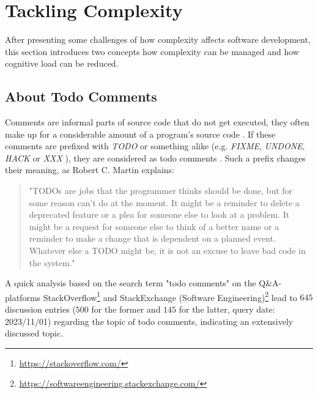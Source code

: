 \section{Tackling Complexity}
\label{sec:tackling-complexity}
After presenting some challenges of how complexity affects software development, this section introduces two concepts how complexity can be managed and how cognitive load can be reduced.

\subsection{About Todo Comments}
\label{sec:introduction-about-todo-comments}
Comments are informal parts of source code that do not get executed, they often make up for a considerable amount of a program's source code \cite{nie_natural_2018}.
If these comments are prefixed with \emph{TODO} or something alike (e.g. \emph{FIXME}, \emph{UNDONE}, \emph{HACK} or \emph{XXX} \cite{storey_how_2009}), they are considered as todo comments \cite{ying_source_2005}.
Such a prefix changes their meaning, as Robert C. Martin explains:
%
\begin{quote}
    "TODOs are jobs that the programmer thinks should be done, but for some reason can't do at the moment. It might be a reminder to delete a deprecated feature or a plea for someone else to look at a problem. It might be a request for someone else to think of a better name or a reminder to make a change that is dependent on a planned event. Whatever else a TODO might be, it is not an excuse to leave bad code in the system." \cite{martin_clean_2009}
\end{quote}
%
A quick analysis based on the search term "todo comments" on the Q\&A-platforms StackOverflow\footnote{\url{https://stackoverflow.com/}} and StackExchange (Software Engineering)\footnote{\url{https://softwareengineering.stackexchange.com/}} lead to $645$ discussion entries ($500$ for the former and $145$ for the latter, query date: 2023/11/01) regarding the topic of todo comments, indicating an extensively discussed topic.

